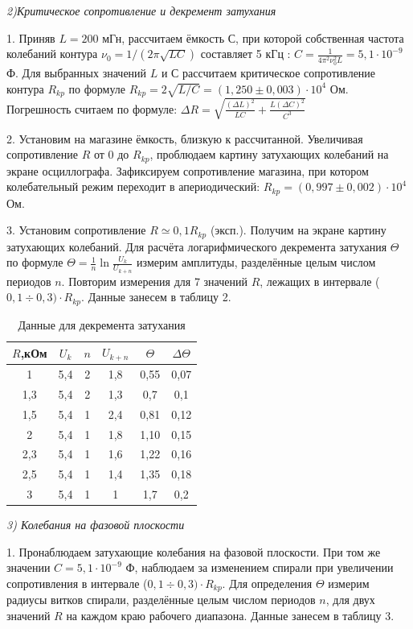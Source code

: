 \documentclass[a4paper,12pt]{article}
\begin{document}
\par \textit{2)Критическое сопротивление и декремент затухания}
\par 1. Приняв $L = 200$ мГн, рассчитаем ёмкость $С$, при которой собственная частота колебаний контура $ \nu_0 = 1/(2\pi \sqrt{LC}) $ составляет 5 кГц : $C = \frac{1}{4\pi^2 \nu_0^2 L} = 5,1 \cdot 10^{-9}$ Ф. Для выбранных значений $L$ и $С$ рассчитаем критическое сопротивление контура $R_{kp}$ по формуле $R_{kp} = 2 \sqrt{L/C} = (1,250 \pm 0,003) \cdot 10^4$ Ом. Погрешность считаем по формуле: $\Delta R = \sqrt{\frac{(\Delta L)^2}{LC} + \frac{L (\Delta C)^2}{C^3}}$
\par 2. Установим на магазине ёмкость, близкую к рассчитанной. Увеличивая сопротивление $R$ от 0 до $R_{kp}$, проблюдаем картину затухающих колебаний на экране осциллографа. Зафиксируем сопротивление магазина, при котором колебательный режим переходит в апериодический: $R_{kp} = (0,997 \pm 0,002) \cdot 10^4$ Ом.
\par 3. Установим сопротивление $R \simeq 0,1 R_{kp}$ (эксп.). Получим на экране картину затухающих колебаний. Для расчёта логарифмического декремента затухания $\Theta$ по формуле $\Theta = \frac{1}{n} \ln \frac{U_k}{U_{k+n}}$ измерим амплитуды, разделённые целым числом периодов $n$. Повторим измерения для 7 значений $R$, лежащих в интервале ($0,1\div 0,3) \cdot R_{kp}$. Данные занесем в таблицу 2.
\begin{table} 
	\centering
	\caption{ Данные для декремента затухания }

\begin{tabular}{|c|c|c|c|c|c|} 
	\hline 
	$R$,кОм & $U_k$ & $n$ & $U_{k+n}$ & $\Theta$ & $\Delta \Theta$\\ 
	\hline 
	1 & 5,4 & 2 & 1,8 & 0,55 & 0,07\\ 
	\hline 
	1,3 & 5,4 & 2 & 1,3 & 0,7 & 0,1 \\ 
	\hline 
	1,5 & 5,4 & 1 & 2,4 & 0,81 & 0,12\\ 
	\hline 
	2 & 5,4 & 1 & 1,8 & 1,10 & 0,15\\ 
	\hline 
	2,3 & 5,4 & 1 & 1,6 & 1,22 & 0,16\\ 
	\hline 
	2,5 & 5,4 & 1 & 1,4 & 1,35 & 0,18\\ 
	\hline 
	3 & 5,4 & 1 & 1 & 1,7 & 0,2 \\ 
	\hline 
\end{tabular} 
\end{table}
	
\par \textit{3) Колебания на фазовой плоскости}
\par 1. Пронаблюдаем затухающие колебания на фазовой плоскости. При том же значении $C = 5,1 \cdot 10^{-9}$ Ф, наблюдаем за изменением спирали при увеличении сопротивления в интервале ($0,1\div 0,3) \cdot R_{kp}$.
Для определения $\Theta$ измерим радиусы витков спирали, разделённые целым числом периодов $n$, для двух значений $R$ на каждом краю рабочего диапазона. Данные занесем в таблицу 3.
\end{document}
